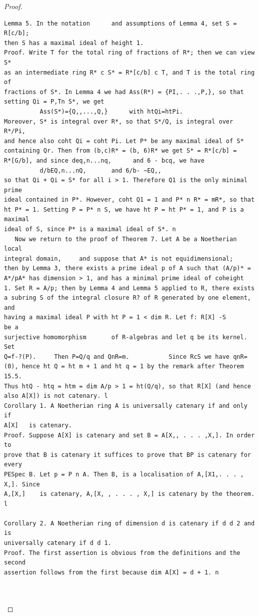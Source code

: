 \begin{proof}
\begin{verbatim}
Lemma 5. In the notation      and assumptions of Lemma 4, set S = R[c/b];
then S has a maximal ideal of height 1.
Proof. Write T for the total ring of fractions of R*; then we can view S*
as an intermediate ring R* c S* = R*[c/b] c T, and T is the total ring of
fractions of S*. In Lemma 4 we had Ass(R*) = {PI,. . .,P,}, so that
setting Qi = P,Tn S*, we get
          Ass(S*)={Q,,...,Q,}      with htQi=htPi.
Moreover, S* is integral over R*, so that S*/Q, is integral over R*/Pi,
and hence also coht Qi = coht Pi. Let P* be any maximal ideal of S*
containing Qr. Then from (b,c)R* = (b, 6)R* we get S* = R*[c/b] =
R*[G/b], and since deq,n...nq,      and 6 - bcq, we have
          d/bEQ,n...nQ,       and 6/b- ~EQ,,
so that Qi + Qi = S* for all i > 1. Therefore Q1 is the only minimal prime
ideal contained in P*. However, coht Q1 = 1 and P* n R* = mR*, so that
ht P* = 1. Setting P = P* n S, we have ht P = ht P* = 1, and P is a maximal
ideal of S, since P* is a maximal ideal of S*. n
   Now we return to the proof of Theorem 7. Let A be a Noetherian local
integral domain,     and suppose that A* is not equidimensional;
then by Lemma 3, there exists a prime ideal p of A such that (A/p)* =
A*/pA* has dimension > 1, and has a minimal prime ideal of coheight
1. Set R = A/p; then by Lemma 4 and Lemma 5 applied to R, there exists
a subring S of the integral closure R? of R generated by one element, and
having a maximal ideal P with ht P = 1 < dim R. Let f: R[X] -S          be a
surjective homomorphism       of R-algebras and let q be its kernel. Set
Q=f-?(P).     Then P=Q/q and QnR=m.           Since RcS we have qnR=
(0), hence ht Q = ht m + 1 and ht q = 1 by the remark after Theorem 15.5.
Thus htQ - htq = htm = dim A/p > 1 = ht(Q/q), so that R[X] (and hence
also A[X]) is not catenary. l
Corollary 1. A Noetherian ring A is universally catenary if and only if
A[X]   is catenary.
Proof. Suppose A[X] is catenary and set B = A[X,, . . . ,X,]. In order to
prove that B is catenary it suffices to prove that BP is catenary for every
PESpec B. Let p = P n A. Then B, is a localisation of A,[X1,. . . , X,]. Since
A,[X,]    is catenary, A,[X, , . . . , X,] is catenary by the theorem.  l

Corollary 2. A Noetherian ring of dimension d is catenary if d d 2 and is
universally catenary if d d 1.
Proof. The first assertion is obvious from the definitions and the second
assertion follows from the first because dim A[X] = d + 1. n



\end{verbatim}
\end{proof}
